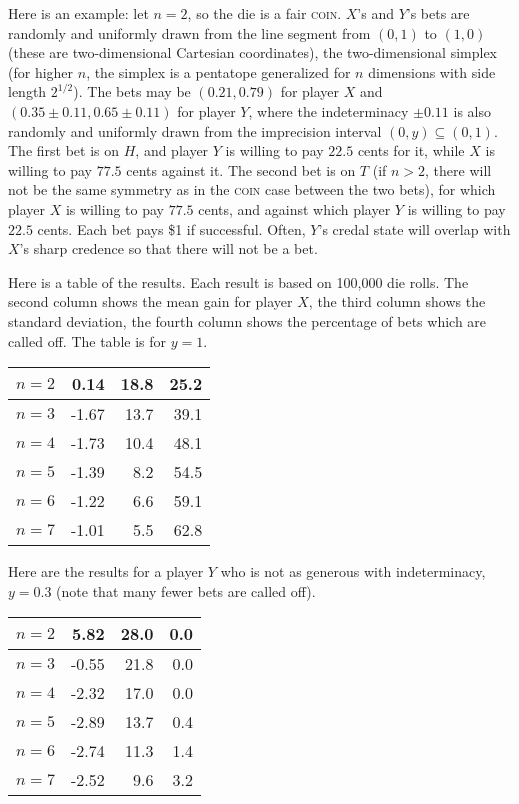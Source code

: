 \documentclass[11pt]{article}
\begin{document}
Here is an example: let $n=2$, so the die is a fair \textsc{coin}.
$X$'s and $Y$'s bets are randomly and uniformly drawn from the line
segment from $(0,1)$ to $(1,0)$ (these are two-dimensional Cartesian
coordinates), the two-dimensional simplex (for higher $n$, the simplex
is a pentatope generalized for $n$ dimensions with side length
$2^{1/2}$). The bets may be $(0.21,0.79)$ for player $X$ and
$(0.35\pm{}0.11,0.65\pm{}0.11)$ for player $Y$, where
the indeterminacy $\pm{}0.11$ is also randomly and uniformly
drawn from the imprecision interval $(0,y)\subseteq(0,1)$. The first
bet is on $H$, and player $Y$ is willing to pay $22.5$ cents for it,
while $X$ is willing to pay $77.5$ cents against it. The second bet is
on $T$ (if $n>2$, there will not be the same symmetry as in the
\textsc{coin} case between the two bets), for which player $X$ is
willing to pay $77.5$ cents, and against which player $Y$ is willing
to pay $22.5$ cents. Each bet pays \$1 if successful. Often, $Y$'s
credal state will overlap with $X$'s sharp credence so that there will
not be a bet.

Here is a table of the results. Each result is based on 100,000 die
rolls. The second column shows the mean gain for player $X$, the third
column shows the standard deviation, the fourth column shows the
percentage of bets which are called off. The table is for $y=1$.

\begin{tabular}{|l|r|r|r|}
  \hline
$n=2$ & 0.14 & 18.8 & 25.2 \\ \hline
$n=3$ & -1.67 & 13.7 & 39.1 \\ \hline
$n=4$ & -1.73 & 10.4 & 48.1 \\ \hline
$n=5$ & -1.39 & 8.2 & 54.5 \\ \hline
$n=6$ & -1.22 & 6.6 & 59.1 \\ \hline
$n=7$ & -1.01 & 5.5 & 62.8 \\ \hline
\end{tabular}

Here are the results for a player $Y$ who is not as generous with
indeterminacy, $y=0.3$ (note that many fewer bets are called off).

\begin{tabular}{|l|r|r|r|}
  \hline
$n=2$ & 5.82 & 28.0 & 0.0 \\ \hline
$n=3$ & -0.55 & 21.8 & 0.0 \\ \hline
$n=4$ & -2.32 & 17.0 & 0.0 \\ \hline
$n=5$ & -2.89 & 13.7 & 0.4 \\ \hline
$n=6$ & -2.74 & 11.3 & 1.4 \\ \hline
$n=7$ & -2.52 & 9.6 & 3.2 \\ \hline
\end{tabular}
\end{document}
